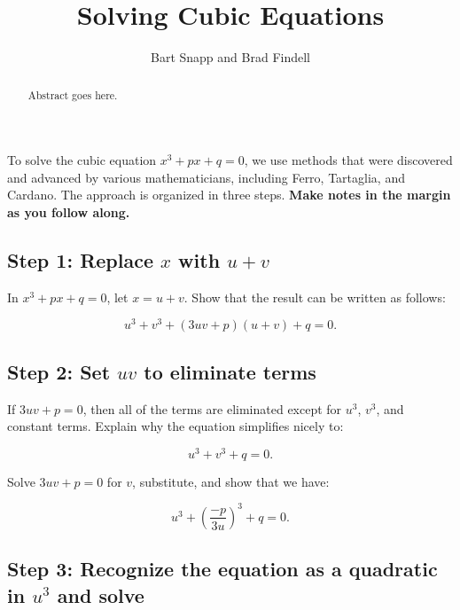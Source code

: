 \documentclass{ximera}
\title{Solving Cubic Equations}
\author{Bart Snapp and Brad Findell}
\begin{document}
\begin{abstract}
Abstract goes here.  
\end{abstract}
\maketitle

\label{A:solvingCubics}

To solve the cubic equation $x^3+px+q=0$, we use methods that were discovered and advanced by various mathematicians, including Ferro, Tartaglia, and Cardano.  The approach is organized in three steps.  \textbf{Make notes in the margin as you follow along.}  


\subsection*{Step 1:  Replace $x$ with $u+v$}
In $x^3+px+q=0$, let $x = u + v$.  %
Show that the result can be written as follows:  

$$u^3+v^3+(3uv+p)(u+v)+q = 0.$$

\subsection*{Step 2: Set $uv$ to eliminate terms}
If $3uv+p=0$, then all of the terms are eliminated except for $u^3$, $v^3$, and constant terms. Explain why the equation simplifies nicely to:

$$u^3+v^3 + q = 0.$$

Solve $3uv+p=0$ for $v$, substitute, and show that we have:  

$$u^3+\left( \frac{-p}{3u}\right)^3+q=0.$$

\subsection*{Step 3:  Recognize the equation as a quadratic in $u^3$ and solve}
\end{document}

